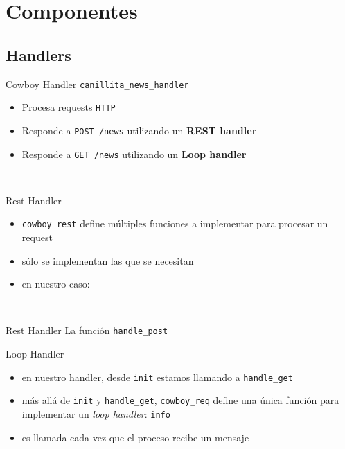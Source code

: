 \documentclass[utf8,hyperref={colorlinks=true}]{beamer}
\begin{document}
\section{Componentes}
\subsection{Handlers}
\begin{frame}[t]{Cowboy Handler}
\alert{\texttt{canillita\_news\_handler}}
\begin{itemize}
	\item Procesa requests \texttt{HTTP}
	\item Responde a \texttt{POST /news} utilizando un \textbf{REST handler}
	\item Responde a \texttt{GET /news} utilizando un \textbf{Loop handler}
\end{itemize}
~\\ 
\end{frame}

\begin{frame}[t]{Rest Handler}
\begin{itemize}
	\item \texttt{cowboy\_rest} define m\'ultiples funciones a implementar para procesar un request
	\item s\'olo se implementan las que se necesitan
	\item en nuestro caso:
\end{itemize}
~\\ \restcallbacks
{}\restcallbacksa
\end{frame}

\begin{frame}[t]{Rest Handler}
{La funci\'on \texttt{handle\_post}}
\end{frame}

\begin{frame}{Loop Handler}
\begin{itemize}
	\item en nuestro handler, desde \texttt{init} estamos llamando a \texttt{handle\_get}
	\item m\'as all\'a de \texttt{init} y \texttt{handle\_get}, \texttt{cowboy\_req} define una \'unica funci\'on para implementar un \emph{loop handler}: \texttt{info}
	\item es llamada cada vez que el proceso recibe un mensaje
\end{itemize}
\end{frame}
\end{document}
